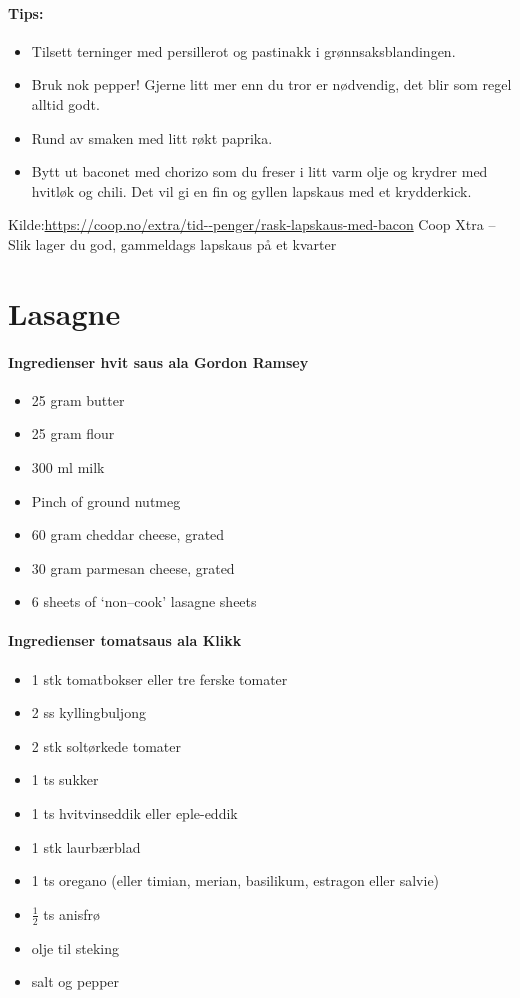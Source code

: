 \documentclass[12pt,a4paper]{book}
\begin{document}
{\paragraph{Tips:}
\begin{itemize}[noitemsep]
	\item Tilsett terninger med persillerot og pastinakk i grønnsaksblandingen.
	\item Bruk nok pepper! Gjerne litt mer enn du tror er nødvendig, det blir som regel alltid godt.
	\item Rund av smaken med litt røkt paprika.
	\item   Bytt ut baconet med chorizo som du freser i litt varm olje og krydrer med hvitløk og chili. Det vil gi en fin og gyllen lapskaus med et krydderkick.
\end{itemize}

Kilde:\url{https://coop.no/extra/tid--penger/rask-lapskaus-med-bacon} Coop Xtra -- Slik lager du god, gammeldags lapskaus på et kvarter
\clearpage{}
\clearpage{}\section{﻿Lasagne}


\paragraph{Ingredienser hvit saus ala Gordon Ramsey}
\begin{itemize}[noitemsep]
	\item 25 gram butter
	\item 25 gram flour
	\item 300 ml milk
	\item Pinch of ground nutmeg
	\item 60 gram cheddar cheese, grated
	\item 30 gram parmesan cheese, grated
	\item 6 sheets of `non--cook' lasagne sheets
\end{itemize}

\paragraph{Ingredienser tomatsaus ala Klikk}
\begin{itemize}[noitemsep]
	\item 1 stk tomatbokser eller tre ferske tomater
	\item 2 ss kyllingbuljong
	\item 2 stk soltørkede tomater
	\item 1 ts sukker
	\item 1 ts hvitvinseddik eller eple-eddik
	\item 1 stk laurbærblad
	\item 1 ts oregano (eller timian, merian, basilikum, estragon eller salvie)
	\item  $\frac{1}{2}$  ts anisfrø
	\item olje til steking
	\item salt og pepper
\end{itemize}

}
\end{document}
